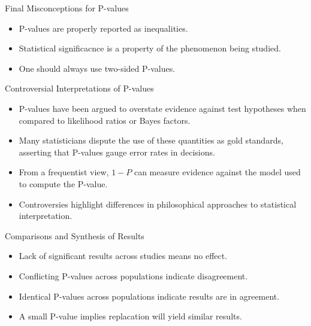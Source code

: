 \documentclass[aspectratio=169, 12pt]{beamer}
\begin{document}
\begin{frame}{Final Misconceptions for P-values} %
\begin{itemize}
    \item P-values are properly reported as inequalities.
    \vspace{0.5cm}
    \item Statistical significacnce is a property of the phenomenon being studied.
    \vspace{0.5cm}
    \item One should always use two-sided P-values.
\end{itemize}
\end{frame}

\begin{frame}{Controversial Interpretations of P-values}
\begin{itemize}
    \item P-values have been argued to overstate evidence against test hypotheses when compared to likelihood ratios or Bayes factors.
    \vspace{0.5cm}
    \item Many statisticians dispute the use of these quantities as gold standards, asserting that P-values gauge error rates in decisions.
    \vspace{0.5cm}
    \item From a frequentist view, \( 1 - P \) can measure evidence against the model used to compute the P-value.
    \vspace{0.5cm}
    \item Controversies highlight differences in philosophical approaches to statistical interpretation.
\end{itemize}
\end{frame}

\begin{frame}{Comparisons and Synthesis of Results} %
\begin{itemize}
    \item Lack of significant results across studies means no effect.
    \vspace{0.5cm}
    \item Conflicting P-values across populations indicate disagreement.
    \vspace{0.5cm}
    \item Identical P-values across populations indicate results are in agreement.
    \vspace{0.5cm}
    \item A small P-value implies replacation will yield similar results.
\end{itemize}
\end{frame}
\end{document}
